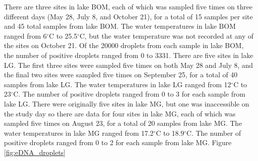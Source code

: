 \documentclass[12pt]{article}\usepackage[]{graphicx}\usepackage[]{color}
\newenvironment{knitrout}{}{} %
\newenvironment{knitrout}{}{} %
\begin{document}
\begin{knitrout}
\color{fgcolor}\begin{table}[!h]

\caption{\label{tab:eDNA_table}\label{tab:eDNA_data}10 sample rows of the eDNA data.}
\centering
{}
\end{table}


\end{knitrout}



There are three sites in lake BOM, each of which was sampled five times on three different days (May 28, July 8, and October 21), for a total of 15 samples per site and 45 total samples from lake BOM. The water temperatures in lake BOM ranged from 6$^\circ$C to 25.5$^\circ$C, but the water temperature was not recorded at any of the sites on October 21. Of the 20000 droplets from each sample in lake BOM, the number of positive droplets ranged from 0 to 3331. There are five sites in lake LG. The first three sites were sampled five times on both May 28 and July 8, and the final two sites were sampled five times on September 25, for a total of 40 samples from lake LG. The water temperatures in lake LG ranged from 12$^\circ$C to 23$^\circ$C. The number of positive droplets ranged from 0 to 3 for each sample from lake LG. There were originally five sites in lake MG, but one was inaccessible on the study day so there are data for four sites in lake MG, each of which was sampled five times on August 23, for a total of 20 samples from lake MG. The water temperatures in lake MG ranged from 17.2$^\circ$C to 18.9$^\circ$C. The number of positive droplets ranged from 0 to 2 for each sample from lake MG. Figure \ref{fig:eDNA_droplets} 
\end{document}
